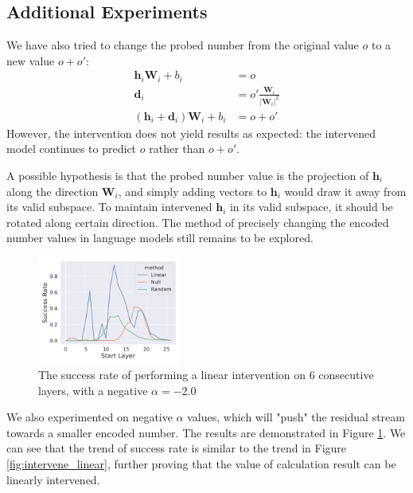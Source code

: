 \documentclass[11pt]{article}
\begin{document}
\subsection{Additional Experiments}
We have also tried to change the probed number from the original value $o$ to a new value $o+o'$:
\begin{align}
    \mathbf{h}_{i}\mathbf{W}_{i}+b_{i} &= o \\
    \mathbf{d}_{i} &= o'\frac{\mathbf{W}_{i}}{|\mathbf{W}_{i}|^{2}} \\
    (\mathbf{h}_{i}+\mathbf{d}_{i})\mathbf{W}_{i}+b_{i} &= o+o'
\end{align}
However, the intervention does not yield results as expected: the intervened model continues to predict $o$ rather than $o+o'$.  

A possible hypothesis is that the probed number value is the projection of $\mathbf{h}_{i}$ along the direction $\mathbf{W}_{i}$, and simply adding vectors to $\mathbf{h}_{i}$ would draw it away from its valid subspace.
To maintain intervened $\mathbf{h}_{i}$ in its valid subspace, it should be rotated along certain direction.
The method of precisely changing the encoded number values in language models still remains to be explored.

\begin{figure}[htbp]
    \centering
    \includegraphics[width=0.42\textwidth]{figures/intervene/null_comparison_minus.pdf}
    \caption{The success rate of performing a linear intervention on 6 consecutive layers, with a negative $\alpha = -2.0$}
    \label{fig:appendix_negative_intervention}
\end{figure}

We also experimented on negative $\alpha$ values, which will "push" the residual stream towards a smaller encoded number.
The results are demonstrated in Figure \ref{fig:appendix_negative_intervention}.
We can see that the trend of success rate is similar to the trend in Figure \ref{fig:intervene_linear}, further proving that the value of calculation result can be linearly intervened.
\end{document}
